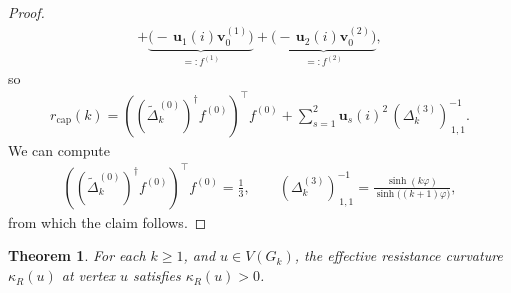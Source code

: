 \documentclass[11pt,a4paper]{amsart}
\newcommand{\resistance}[1]{\kappa_R\left({#1}\right)}
\newtheorem{theorem}{Theorem}[section]
\begin{document}
\begin{proof}
\begin{align*}
             +\underbrace{\bigl(-\,\mathbf{u}_1(i)\mathbf{v}^{(1)}_0\bigr)}_{=:f^{(1)}}
             +\underbrace{\bigl(-\,\mathbf{u}_2(i)\mathbf{v}^{(2)}_0\bigr)}_{=:f^{(2)}},
        \end{align*}
    so
        \begin{align*}
            r_{\mathrm{cap}}(k)
            =((\widetilde\Delta_k^{(0)})^\dagger f^{(0)})^\top f^{(0)}
             +\sum_{s=1}^2\mathbf{u}_s(i)^2\,
              (\Delta_k^{(3)})^{-1}_{\,1,1}.
        \end{align*}
    We can compute
        \begin{align*}
            ((\widetilde\Delta_k^{(0)})^\dagger f^{(0)})^\top f^{(0)}
            =\frac{1}{3},
            \qquad
            (\Delta_k^{(3)})^{-1}_{\,1,1}
            =\frac{\sinh(k\varphi)}{\sinh\bigl((k+1)\varphi\bigr)},
        \end{align*}
    from which the claim follows.
\end{proof}

\begin{theorem}\label{thm:positivity-tube}
    For each $k\geq 1$, and $u\in V(G_k)$, the effective resistance curvature $\resistance{u}$ at vertex $u$ satisfies $\resistance{u} > 0$.
\end{theorem}
\end{document}
